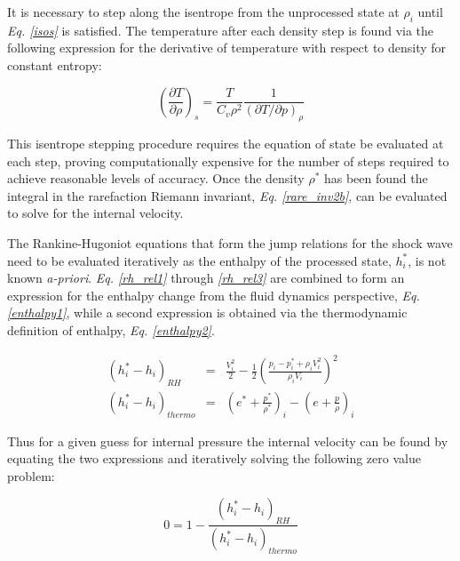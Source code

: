 \documentclass[a4paper,10pt]{article}
\begin{document}
It is necessary to step along the isentrope from the unprocessed state at $\rho_{i}$ until \emph{Eq. \ref{isos}} is satisfied.  The temperature after each density step is found via the following expression for the derivative of temperature with respect to density for constant entropy:

\begin{equation}
\left ( \frac{ \partial T }{ \partial \rho } \right )_{s} = \frac{T}{C_{v}\rho^{2}} \frac{1}{(\partial T / \partial p)_{\rho}} \label{isen}
\end{equation}

This isentrope stepping procedure requires the equation of state be evaluated at each step, proving computationally expensive for the number of steps required to achieve reasonable levels of accuracy.  Once the density $\rho^{*}$ has been found the integral in the rarefaction Riemann invariant, \emph{Eq. \ref{rare_inv2b}}, can be evaluated to solve for the internal velocity.
\par
\medskip

The Rankine-Hugoniot equations that form the jump relations for the shock wave need to be evaluated iteratively as the enthalpy of the processed state, $h_{i}^{*}$, is not known \emph{a-priori}.  \emph{Eq. \ref{rh_rel1}} through \emph{\ref{rh_rel3}} are combined to form an expression for the enthalpy change from the fluid dynamics perspective, \emph{Eq. \ref{enthalpy1}}, while a second expression is obtained via the thermodynamic definition of enthalpy, \emph{Eq. \ref{enthalpy2}}.
\par
\begin{eqnarray}
\left ( h_{i}^{*} - h_{i} \right )_{RH} &=& \frac{V_{i}^{2}}{2} - \frac{1}{2} \left ( \frac{ p_{i} - p_{i}^{*} + \rho_{i} V_{i}^{2}}{\rho_{i} V_{i}} \right ) ^{2} \label{enthalpy1} \\
\left ( h_{i}^{*} - h_{i} \right )_{thermo} &=& \left ( e^{*} + \frac{p^{*}}{\rho^{*}} \right )_{i} - \left ( e + \frac{p}{\rho} \right )_{i} \label{enthalpy2}
\end{eqnarray}

Thus for a given guess for internal pressure the internal velocity can be found by equating the two expressions and iteratively solving the following zero value problem:

\begin{equation}
0=1-\frac{\left ( h_{i}^{*} - h_{i} \right )_{RH}}{\left ( h_{i}^{*} - h_{i} \right )_{thermo}} \label{shock_energy}
\end{equation}
\end{document}
